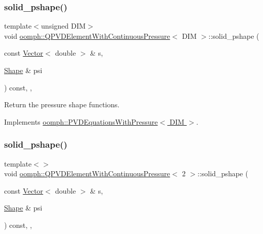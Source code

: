 \subsubsection{\texorpdfstring{solid\+\_\+pshape()}{solid\_pshape()}\hspace{0.1cm}{\footnotesize\ttfamily [1/3]}}
{\footnotesize\ttfamily template$<$unsigned D\+IM$>$ \\
void \hyperlink{classoomph_1_1QPVDElementWithContinuousPressure}{oomph\+::\+Q\+P\+V\+D\+Element\+With\+Continuous\+Pressure}$<$ D\+IM $>$\+::solid\+\_\+pshape (\begin{DoxyParamCaption}\item[{const \hyperlink{classoomph_1_1Vector}{Vector}$<$ double $>$ \&}]{s,  }\item[{\hyperlink{classoomph_1_1Shape}{Shape} \&}]{psi }\end{DoxyParamCaption}) const\hspace{0.3cm}{\ttfamily [inline]}, {\ttfamily [protected]}, {\ttfamily [virtual]}}



Return the pressure shape functions. 



Implements \hyperlink{classoomph_1_1PVDEquationsWithPressure_ad580f7919412f6b574b76f514f56282c}{oomph\+::\+P\+V\+D\+Equations\+With\+Pressure$<$ D\+I\+M $>$}.

\mbox{\label{classoomph_1_1QPVDElementWithContinuousPressure_a1e02992de2dff0a1b9b52eea50c84171}} 
\subsubsection{\texorpdfstring{solid\+\_\+pshape()}{solid\_pshape()}\hspace{0.1cm}{\footnotesize\ttfamily [2/3]}}
{\footnotesize\ttfamily template$<$$>$ \\
void \hyperlink{classoomph_1_1QPVDElementWithContinuousPressure}{oomph\+::\+Q\+P\+V\+D\+Element\+With\+Continuous\+Pressure}$<$ 2 $>$\+::solid\+\_\+pshape (\begin{DoxyParamCaption}\item[{const \hyperlink{classoomph_1_1Vector}{Vector}$<$ double $>$ \&}]{s,  }\item[{\hyperlink{classoomph_1_1Shape}{Shape} \&}]{psi }\end{DoxyParamCaption}) const\hspace{0.3cm}{\ttfamily [inline]}, {\ttfamily [protected]}, {\ttfamily [virtual]}}


